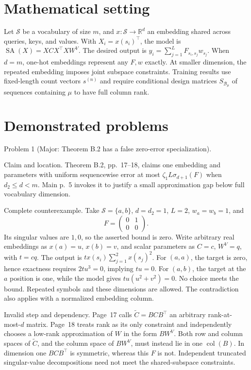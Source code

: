 \documentclass[10pt]{article}
\begin{document}
\section*{Mathematical setting}
Let \(\mathcal S\) be a vocabulary of size \(m\), and \(x:\mathcal S\to\mathbb R^d\) an embedding shared across queries, keys, and values. With \(X_i=x(s_i)^\top\), the model is \(\operatorname{SA}(X)=XCX^\top XW^V\). The desired output is \(y_i=\sum_{j=1}^L F_{s_i,s_j}w_{s_j}\). When \(d=m\), one-hot embeddings represent any \(F,w\) exactly. At smaller dimension, the repeated embedding imposes joint subspace constraints. Training results use fixed-length count vectors \(s^{(n)}\) and require conditional design matrices \(S_{\mathcal B_\mu}\) of sequences containing \(\mu\) to have full column rank.\par
\section*{Demonstrated problems}
Problem 1 (Major: Theorem B.2 has a false zero-error specialization).\par
Claim and location. Theorem B.2, pp. 17–18, claims one embedding and parameters with uniform sequencewise error at most \(\zeta_1L\sigma_{d+1}(F)\) when \(d_2\le d<m\). Main p. 5 invokes it to justify a small approximation gap below full vocabulary dimension.\par
Complete counterexample. Take \(\mathcal S=\{a,b\}\), \(d=d_2=1\), \(L=2\), \(w_a=w_b=1\), and \[F=\begin{pmatrix}0&1\\0&0\end{pmatrix}.\] Its singular values are \(1,0\), so the asserted bound is zero. Write arbitrary real embeddings as \(x(a)=u\), \(x(b)=v\), and scalar parameters as \(C=c\), \(W^V=q\), with \(t=cq\). The output is \(t x(s_i)\sum_{j=1}^2x(s_j)^2\). For \((a,a)\), the target is zero, hence exactness requires \(2tu^3=0\), implying \(tu=0\). For \((a,b)\), the target at the \(a\) position is one, while the model gives \(tu(u^2+v^2)=0\). No choice meets the bound. Repeated symbols and these dimensions are allowed. The contradiction also applies with a normalized embedding column.\par
Invalid step and dependency. Page 17 calls \(\widetilde C=BCB^\top\) an arbitrary rank-at-most-\(d\) matrix. Page 18 treats rank as its only constraint and independently chooses a low-rank approximation of \(W\) in the form \(BW^V\). Both row and column spaces of \(\widetilde C\), and the column space of \(BW^V\), must instead lie in one \(\operatorname{col}(B)\). In dimension one \(BCB^\top\) is symmetric, whereas this \(F\) is not. Independent truncated singular-value decompositions need not meet the shared-subspace constraints.\par
\end{document}
